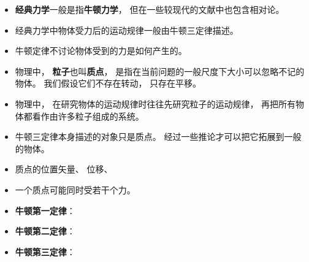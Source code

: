 
\begin{issues}
\issueDraft
\end{issues}

\begin{itemize}
\item \textbf{经典力学}一般是指\textbf{牛顿力学}， 但在一些较现代的文献中也包含相对论。
\item 经典力学中物体受力后的运动规律一般由牛顿三定律描述。
\item 牛顿定律不讨论物体受到的力是如何产生的。
\item 物理中， \textbf{粒子}也叫\textbf{质点}， 是指在当前问题的一般尺度下大小可以忽略不记的物体。 我们假设它们不存在转动， 只存在平移。
\item 物理中， 在研究物体的运动规律时往往先研究粒子的运动规律， 再把所有物体都看作由许多粒子组成的系统。
\item 牛顿三定律本身描述的对象只是质点。 经过一些推论才可以把它拓展到一般的物体。
\item 质点的位置矢量、 位移、 
\item 一个质点可能同时受若干个力。
\item \textbf{牛顿第一定律}：
\item \textbf{牛顿第二定律}：
\item \textbf{牛顿第三定律}：
\end{itemize}
